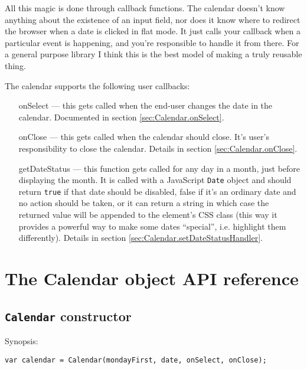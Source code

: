 \documentclass[a4paper,10pt]{article}
\begin{document}
All this magic is done through callback functions.  The calendar doesn't know
anything about the existence of an input field, nor does it know where to
redirect the browser when a date is clicked in flat mode.  It just calls your
callback when a particular event is happening, and you're responsible to handle
it from there.  For a general purpose library I think this is the best model of
making a truly reusable thing.

The calendar supports the following user callbacks:

\begin{itemize}

\item [onSelect] --- this gets called when the end-user changes the date in the
calendar.  Documented in section \ref{sec:Calendar.onSelect}.

\item [onClose] --- this gets called when the calendar should close.  It's
user's responsibility to close the calendar.  Details in section
\ref{sec:Calendar.onClose}.

\item [getDateStatus] --- this function gets called for any day in a month,
just before displaying the month.  It is called with a JavaScript \texttt{Date}
object and should return \texttt{true} if that date should be disabled, false
if it's an ordinary date and no action should be taken, or it can return a
string in which case the returned value will be appended to the element's CSS
class (this way it provides a powerful way to make some dates ``special'',
i.e. highlight them differently).  Details in section
\ref{sec:Calendar.setDateStatusHandler}.

\end{itemize}






\section{The Calendar object API reference}\label{sec:Calendar_reference}

\subsection{\texttt{Calendar} constructor}\label{sec:Calendar.constructor}

\noindent Synopsis:

\begin{verbatim}
var calendar = Calendar(mondayFirst, date, onSelect, onClose);
\end{verbatim}
\end{document}
